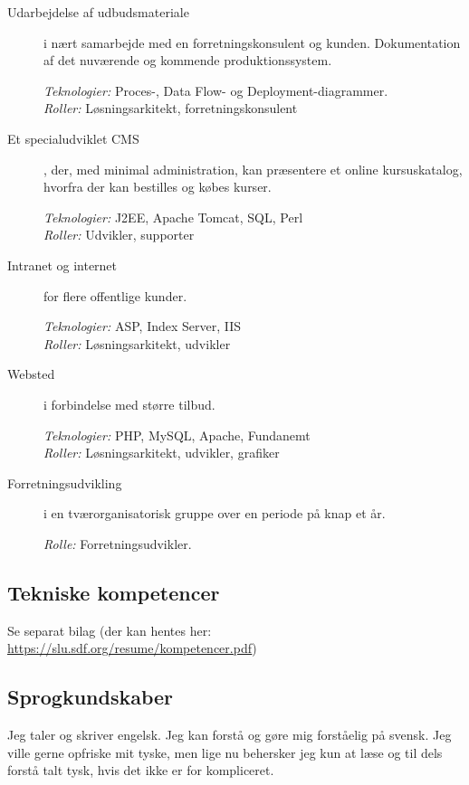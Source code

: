 \documentclass[a4paper,11pt]{article}
\begin{document}
\begin{description}
\item[Udarbejdelse af udbudsmateriale] i nært samarbejde med en
  forretningskonsulent og kunden. Dokumentation af det nuværende og
  kommende produktionssystem.

  \textit{Teknologier:} Proces-, Data Flow- og Deployment-diagrammer.\\
  \textit{Roller:} Løsningsarkitekt, forretningskonsulent

\item[Et specialudviklet CMS], der, med minimal
  administration, kan præsentere et online kursuskatalog,
  hvorfra der kan bestilles og købes kurser.

  \textit{Teknologier:} J2EE, Apache Tomcat, SQL, Perl\\
  \textit{Roller:} Udvikler, supporter

\item[Intranet og internet] for flere offentlige kunder.

  \textit{Teknologier:} ASP, Index Server, IIS\\
  \textit{Roller:} Løsningsarkitekt, udvikler

\item[Websted] i forbindelse med større tilbud.

  \textit{Teknologier:} PHP, MySQL, Apache, Fundanemt\\
  \textit{Roller:} Løsningsarkitekt, udvikler, grafiker

\item[Forretningsudvikling] i en
  tværorganisatorisk gruppe over en periode på knap et
  år.

  \textit{Rolle:} Forretningsudvikler.

\end{description}

\subsection*{Tekniske kompetencer}

Se separat bilag (der kan hentes her: \url{https://slu.sdf.org/resume/kompetencer.pdf})

\subsection*{Sprogkundskaber}

Jeg taler og skriver engelsk. Jeg kan forstå og gøre mig forståelig på
svensk. Jeg ville gerne opfriske mit tyske, men lige nu behersker jeg
kun at læse og til dels forstå talt tysk, hvis det ikke er for
kompliceret.
\end{document}
